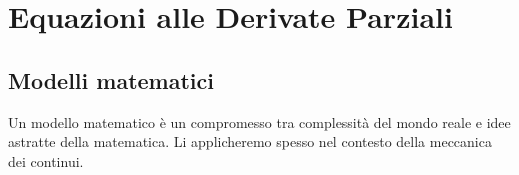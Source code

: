 \documentclass[10pt,a4paper,twoside,openright]{book}
\begin{document}
\part{Equazioni alle Derivate Parziali}
\chapter{Modelli matematici}

Un modello matematico è un compromesso tra complessità del mondo reale e idee astratte della matematica. Li applicheremo spesso nel contesto della meccanica dei continui.
\end{document}
